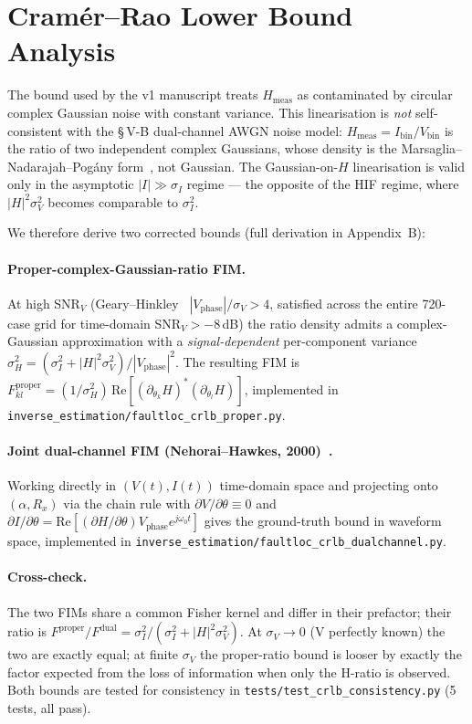 \documentclass[journal]{IEEEtran}
\begin{document}
\section{Cram\'er--Rao Lower Bound Analysis}\label{sec:crlb}

The bound used by the v1 manuscript treats $H_{\mathrm{meas}}$ as
contaminated by circular complex Gaussian noise with constant
variance.  This linearisation is \emph{not} self-consistent with the
\S\,V-B dual-channel AWGN noise model: $H_{\mathrm{meas}} =
I_{\mathrm{bin}}/V_{\mathrm{bin}}$ is the ratio of two independent
complex Gaussians, whose density is the
Marsaglia--Nadarajah--Pog\'any form~\cite{Marsaglia1965Ratio,
NadarajahPogany2018,Kuruoglu2018ASCE}, not Gaussian.  The Gaussian-on-$H$
linearisation is valid only in the asymptotic
$|I| \gg \sigma_I$ regime --- the opposite of the HIF regime,
where $|H|^2 \sigma_V^2$ becomes comparable to $\sigma_I^2$.

We therefore derive two corrected bounds (full derivation in
Appendix~B):

\paragraph{Proper-complex-Gaussian-ratio FIM.}
At high SNR$_V$ (Geary--Hinkley~\cite{Marsaglia1965Ratio}
$|V_{\mathrm{phase}}|/\sigma_V > 4$, satisfied across the entire
720-case grid for time-domain SNR$_V > -8$\,dB) the ratio density
admits a complex-Gaussian approximation with a
\emph{signal-dependent} per-component variance
$\sigma_H^2 = (\sigma_I^2 + |H|^2 \sigma_V^2)/|V_{\mathrm{phase}}|^2$.
The resulting FIM is
$F^{\mathrm{proper}}_{kl} = (1/\sigma_H^2)\,
\mathrm{Re}[(\partial_{\theta_k} H)^* (\partial_{\theta_l} H)]$,
implemented in \texttt{inverse\_estimation/faultloc\_crlb\_proper.py}.

\paragraph{Joint dual-channel FIM (Nehorai--Hawkes, 2000)~\cite{NehoraiHawkes2000}.}
Working directly in $(V(t), I(t))$ time-domain space and projecting
onto $(\alpha, R_x)$ via the chain rule with $\partial V/\partial\theta
\equiv 0$ and $\partial I/\partial\theta = \mathrm{Re}[(\partial H/
\partial \theta) V_{\mathrm{phase}} e^{j\omega_0 t}]$ gives the
ground-truth bound in waveform space, implemented in
\texttt{inverse\_estimation/faultloc\_crlb\_dualchannel.py}.

\paragraph{Cross-check.}
The two FIMs share a common Fisher kernel and differ in their
prefactor; their ratio is $F^{\mathrm{proper}}/F^{\mathrm{dual}} =
\sigma_I^2/(\sigma_I^2 + |H|^2 \sigma_V^2)$.  At $\sigma_V \to 0$
(V perfectly known) the two are exactly equal; at finite $\sigma_V$
the proper-ratio bound is looser by exactly the factor expected from
the loss of information when only the H-ratio is observed.  Both
bounds are tested for consistency in
\texttt{tests/test\_crlb\_consistency.py} (5 tests, all pass).
\end{document}
